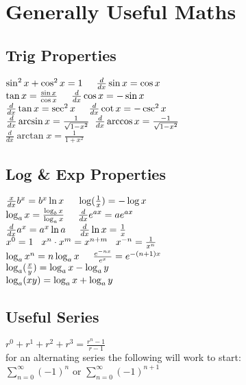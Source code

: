\section{Generally Useful Maths}
\subsection*{Trig Properties}
$\sin^2x + \cos^2x = 1 \hspace{5mm} \frac{d}{dx}\sin x= \cos x$\\
$\tan x = \frac{\sin x}{\cos x} \hspace{5mm} \frac{d}{dx}\cos x= - \sin x$\\
$\frac{d}{dx}\tan x = \sec^2 x \hspace{5mm} \frac{d}{dx}\cot x = - \csc^2 x$\\
$\frac{d}{dx} \arcsin x = \frac{1}{\sqrt{1 - x^2}}  \hspace{2mm}   \frac{d}{dx} \arccos x = \frac{-1}{\sqrt{1 - x^2}}  $\\
$\frac{d}{dx} \arctan x = \frac{1}{1 + x^2}      $\\

\subsection*{Log \& Exp Properties}
$\frac{x}{dx} b^x = b^x \ln x \hspace{5mm} \log(\frac{1}{x}) = - \log x$\\
$\log_ax = \frac{\log_bx}{\log_ax} \hspace{5mm} \frac{d}{dx}e^{ax} = ae^{ax}$\\
$\frac{d}{dx}a^{x} = a^{x} \ln a \hspace{5mm} \frac{d}{dx} \ln x = \frac{1}{x} $\\
$x^0 = 1 \hspace{3mm} x^n \cdot x^m = x^{n+m} \hspace{3mm} x^{-n} = \frac{1}{x^n}    $\\
$\log_a x^n = n \log_a x \hspace{5mm} \frac{e^{-n x}}{e^x} = e^{-(n+1)x}    $\\
$\log_a (\frac{x}{y}) = \log_a x - \log_a y \hspace{2mm}  $\\
$\log_a (xy) = \log_a x + \log_a y \hspace{2mm}  $\\

\subsection*{Useful Series}
$r^0 + r^1 + r^2 + r^3 = \frac{r^n - 1}{r - 1}$\\
for an alternating series the following will work to start:\\
$ \sum_{n=0}^{\infty} (-1)^n $ or $ \sum_{n=0}^{\infty} (-1)^{n+1} $\\

